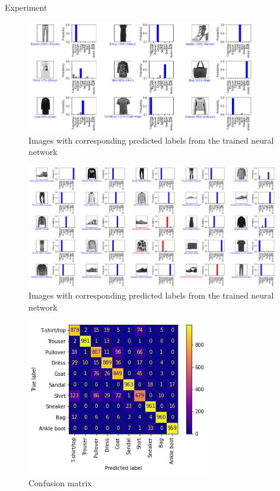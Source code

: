 \documentclass[10pt]{beamer}
\theoremstyle{remark}
\theoremstyle{definition}
\begin{document}
\begin{frame}[allowframebreaks]{Experiment}
	\begin{figure}
		\centering
		\includegraphics[width=10cm]{images_with_predictions_1.png}
		\caption{Images with corresponding predicted labels from the trained neural network}
	\end{figure}
	\begin{figure}
		\centering
		\includegraphics[width=11cm]{images_with_predictions_2.png}
		\caption{Images with corresponding predicted labels from the trained neural network}
	\end{figure}

	\begin{figure}
		\centering
		\includegraphics[width=8cm]{confusion_matrix.png}
		\caption{Confusion matrix}
	\end{figure}


\end{frame}
\end{document}
